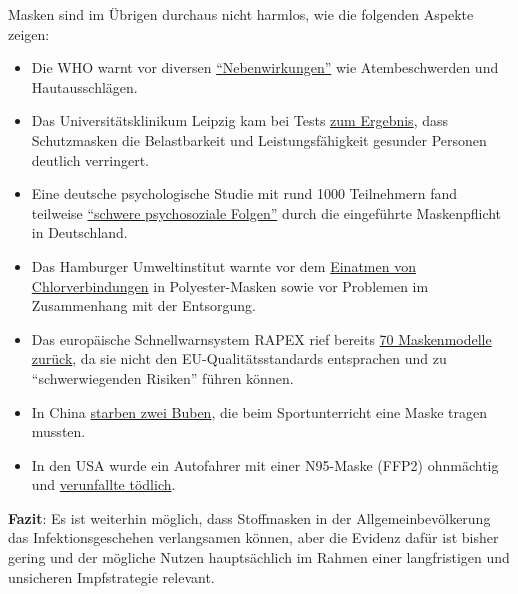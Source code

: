 Masken sind im Übrigen durchaus nicht harmlos, wie die folgenden Aspekte
zeigen:

\begin{itemize}
\tightlist
\item
  Die WHO warnt vor diversen
  \href{https://www.who.int/publications/i/item/advice-on-the-use-of-masks-in-the-community-during-home-care-and-in-healthcare-settings-in-the-context-of-the-novel-coronavirus-(2019-ncov)-outbreak}{``Nebenwirkungen''}
  wie Atembeschwerden und Hautausschlägen.
\item
  Das Universitätsklinikum Leipzig kam bei Tests
  \href{https://science.orf.at/stories/3201213/}{zum Ergebnis}, dass
  Schutzmasken die Belastbarkeit und Leistungsfähigkeit gesunder
  Personen deutlich verringert.
\item
  Eine deutsche psychologische Studie mit rund 1000 Teilnehmern fand
  teilweise
  \href{https://corona-transition.org/der-maskenzwang-ist-verantwortlich-fur-schwere-psychische-schaden-und-die}{``schwere
  psychosoziale Folgen''} durch die eingeführte Maskenpflicht in
  Deutschland.
\item
  Das Hamburger Umweltinstitut warnte vor dem
  \href{https://corona-transition.org/maskentragen-noch-ungesunder-als-gedacht}{Einatmen
  von Chlorverbindungen} in Polyester-Masken sowie vor Problemen im
  Zusammenhang mit der Entsorgung.
\item
  Das europäische Schnellwarnsystem RAPEX rief bereits
  \href{https://corona-transition.org/maskentragen-noch-ungesunder-als-gedacht}{70
  Maskenmodelle zurück}, da sie nicht den EU-Qualitätsstandards
  entsprachen und zu ``schwerwiegenden Risiken'' führen können.
\item
  In China
  \href{https://www.ibtimes.com/2-chinese-boys-wearing-masks-during-gym-class-dropped-dead-reports-say-2971556}{starben
  zwei Buben}, die beim Sportunterricht eine Maske tragen mussten.
\item
  In den USA wurde ein Autofahrer mit einer N95-Maske (FFP2) ohnmächtig
  und
  \href{https://nypost.com/2020/04/24/driver-crashes-car-after-passing-out-from-wearing-n95-mask/}{verunfallte
  tödlich}.
\end{itemize}

\textbf{Fazit}: Es ist weiterhin möglich, dass Stoffmasken in der
Allgemeinbevölkerung das Infektions­geschehen verlangsamen können, aber
die Evidenz dafür ist bisher gering und der mögliche Nutzen
hauptsächlich im Rahmen einer langfristigen und unsicheren Impfstrategie
relevant.

